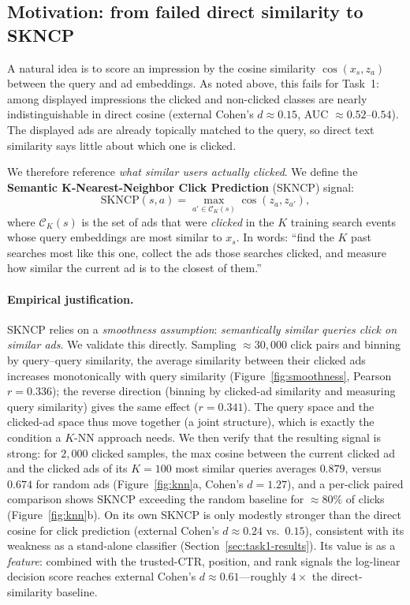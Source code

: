 \documentclass[sigconf, nonacm]{acmart}
\begin{document}
\subsection{Motivation: from failed direct similarity to SKNCP}

A natural idea is to score an impression by the cosine similarity
$\cos(x_s,z_a)$ between the query and ad embeddings. As noted above, this fails
for Task~1: among displayed impressions the clicked and non-clicked classes are
nearly indistinguishable in direct cosine (external Cohen's $d\!\approx\!0.15$, 
AUC $\approx0.52$--$0.54$). The displayed ads are already topically matched to the
query, so direct text similarity says little about which one is clicked.

We therefore reference \emph{what similar users actually clicked}. We define the
\textbf{Semantic K-Nearest-Neighbor Click Prediction} (SKNCP) signal:
\begin{equation}
\mathrm{SKNCP}(s,a)=
\max_{a'\in\mathcal{C}_K(s)} \cos(z_a, z_{a'}),
\label{eq:skncp}
\end{equation}
where $\mathcal{C}_K(s)$ is the set of ads that were \emph{clicked} in the $K$
training search events whose query embeddings are most similar to $x_s$. In
words: ``find the $K$ past searches most like this one, collect the ads those
searches clicked, and measure how similar the current ad is to the closest of
them.''

\paragraph{Empirical justification.}
SKNCP relies on a \emph{smoothness assumption}: \emph{semantically similar
queries click on similar ads}. We validate this directly. Sampling
$\approx30{,}000$ click pairs and binning by query--query similarity, the
average similarity between their clicked ads increases monotonically with query
similarity (Figure~\ref{fig:smoothness}, Pearson $r=0.336$); the reverse
direction (binning by clicked-ad similarity and measuring query similarity)
gives the same effect ($r=0.341$). The query space and the clicked-ad space
thus move together (a joint structure), which is exactly the condition a
$K$-NN approach needs. We then verify that the resulting signal is strong: for
$2{,}000$ clicked samples, the max cosine between the current clicked ad and the
clicked ads of its $K{=}100$ most similar queries averages $0.879$, versus
$0.674$ for random ads (Figure~\ref{fig:knn}a, Cohen's $d=1.27$), and a per-click
paired comparison shows SKNCP exceeding the random baseline for $\approx80\%$ of
clicks (Figure~\ref{fig:knn}b). On its own SKNCP is only modestly stronger than the direct cosine for click
prediction (external Cohen's $d\!\approx\!0.24$ vs.\ $0.15$), consistent with its
weakness as a stand-alone classifier (Section~\ref{sec:task1-results}). Its value
is as a \emph{feature}: combined with the trusted-CTR, position, and rank signals
the log-linear decision score reaches external Cohen's $d\!\approx\!0.61$---roughly
$4\times$ the direct-similarity baseline.
\end{document}
